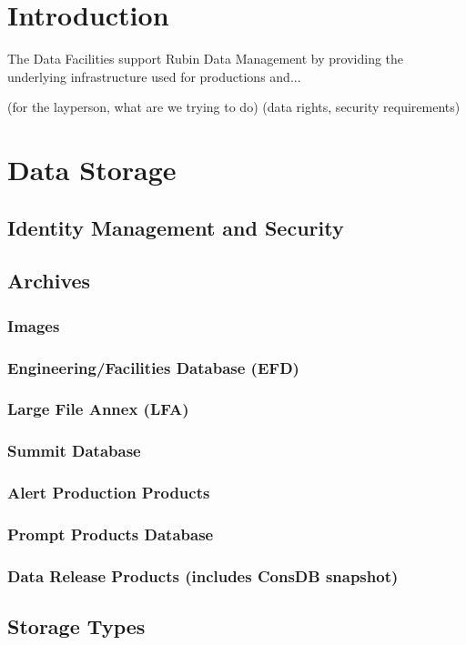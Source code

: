\section{Introduction}

The Data Facilities support Rubin Data Management by providing the underlying infrastructure used for productions and...

(for the layperson, what are we trying to do)
(data rights, security requirements)

\section{Data Storage}
        \subsection{Identity Management and Security}
	\subsection{Archives}
	    \subsubsection{Images}
            \subsubsection{Engineering/Facilities Database (EFD)}
	    \subsubsection{Large File Annex (LFA)}
	    \subsubsection{Summit Database}
	    \subsubsection{Alert Production Products}
	    \subsubsection{Prompt Products Database}
	    \subsubsection{Data Release Products (includes ConsDB snapshot)}
	\subsection{Storage Types}
